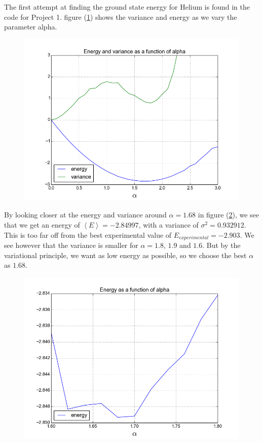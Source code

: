 \documentclass[a4paper, 12pt, titlepage]{article}
\begin{document}
 The first attempt at finding the ground state energy for Helium is found in the code for Project 1. figure (\ref{Helium1}) shows the variance and energy as we vary the parameter alpha. 

 \begin{figure}[H]
 	\centering
 	\includegraphics[width=\textwidth]{../python_programs/EnergyVariance_helium1.png}
 	\label{Helium1}
 \end{figure}

 By looking closer at the energy and variance around $\alpha = 1.68$ in figure (\ref{Helium2}), we see that we get an energy of $\left<E\right> = -2.84997$, with a variance of $\sigma ^2 = 0.932912$. This is too far off from the best experimental value of $E_{experimental} = -2.903$. We see however that the variance is smaller for $\alpha = 1.8$, $1.9$ and $1.6$. But by the variational principle, we want as low energy as possible, so we choose the best $\alpha$ as $1.68$. 
 
 \begin{figure}[H]
 	\centering
 	\includegraphics[width=\textwidth]{../python_programs/EnergyVariance_helium2.png}
 	\label{Helium2}
 \end{figure}
\end{document}
